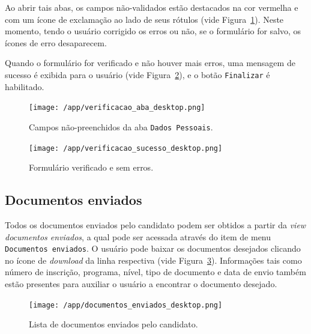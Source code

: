 \documentclass[
  10.5pt,				  %
	openright,			%
	twoside,			  %
  a5paper,
  chapter=TITLE,	%
	section=TITLE,	%
  hyphens,        %
	english,        %
	brazil          %
]{abntex2}
\begin{document}
Ao abrir tais abas, os campos não-validados estão destacados na cor vermelha e com um ícone de exclamação ao lado de seus rótulos (vide Figura~\ref{fig:verificacao_aba}). Neste momento, tendo o usuário corrigido os erros ou não, se o formulário for salvo, os ícones de erro desaparecem.

Quando o formulário for verificado e não houver mais erros, uma mensagem de sucesso é exibida para o usuário (vide Figura~\ref{fig:verificacao_sucesso}), e o botão \texttt{Finalizar} é habilitado.

\begin{figure}[!ht]
  \caption{\label{fig:verificacao_aba} Campos não-preenchidos da aba \texttt{Dados Pessoais}.}
  \begin{center}
    \texttt{[image: /app/verificacao\_aba\_desktop.png]}
  \end{center}
\end{figure}


\begin{figure}[!ht]
  \caption{\label{fig:verificacao_sucesso} Formulário verificado e sem erros.}
  \begin{center}
    \texttt{[image: /app/verificacao\_sucesso\_desktop.png]}
  \end{center}
\end{figure}

\subsection{Documentos enviados}\label{sec:documentos_enviados}

Todos os documentos enviados pelo candidato podem ser obtidos a partir da \emph{view documentos enviados}, a qual pode ser acessada através do item de menu \texttt{Documentos enviados}. O usuário pode baixar os documentos desejados clicando no ícone de \emph{download} da linha respectiva (vide Figura~\ref{fig:documentos_enviados}). Informações tais como número de inscrição, programa, nível, tipo de documento e data de envio também estão presentes para auxiliar o usuário a encontrar o documento desejado.


\begin{figure}[!ht]
  \caption{\label{fig:documentos_enviados} Lista de documentos enviados pelo candidato.}
  \begin{center}
    \texttt{[image: /app/documentos\_enviados\_desktop.png]}
  \end{center}
\end{figure}
\end{document}
